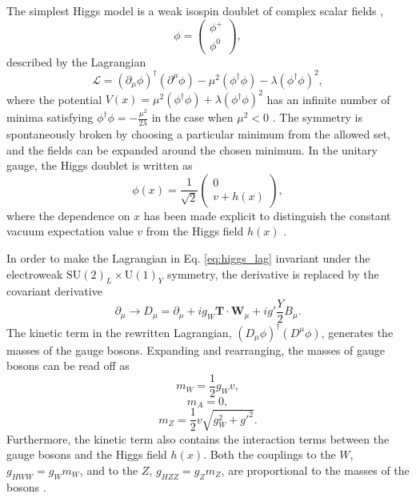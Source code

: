 The simplest Higgs model is a weak isospin doublet of complex scalar fields \cite{Thomson:2013zua},
\begin{equation}
\phi = \begin{pmatrix} \phi^+ \\ \phi^0 \end{pmatrix},
\end{equation}
described by the Lagrangian
\begin{equation}
\mathcal{L} = (\partial_\mu \phi)^\dag (\partial^\mu \phi) - \mu^2(\phi^\dag\phi) - \lambda(\phi^\dag \phi)^2,
\label{eq:higgs_lag}
\end{equation}
where the potential $V(x) = \mu^2(\phi^\dag\phi) + \lambda(\phi^\dag \phi)^2$
has an infinite number of minima satisfying $\phi^\dag \phi = -\frac{\mu^2}{2\lambda}$
in the case when $\mu^2 < 0$ \cite{Thomson:2013zua}. The symmetry is spontaneously broken by choosing a
particular minimum from the allowed set, and the fields can be expanded around the chosen minimum.
In the unitary gauge, the Higgs doublet is written as
\begin{equation}
\phi(x) = \frac{1}{\sqrt{2}} \begin{pmatrix} 0 \\ v + h(x) \end{pmatrix},
\end{equation}
where the dependence on $x$ has been made explicit to distinguish the constant
vacuum expectation value $v$ from the Higgs field $h(x)$ \cite{Thomson:2013zua}.

In order to make the Lagrangian in Eq. \ref{eq:higgs_lag} invariant under the electroweak
$\text{SU}(2)_L \times \text{U}(1)_Y$ symmetry, the derivative is replaced by the covariant
derivative \cite{Thomson:2013zua}
\begin{equation}
\partial_\mu \rightarrow D_\mu = \partial_\mu + i g_W \mathbf{T} \cdot \mathbf{W}_\mu
+ i g' \frac{Y}{2} B_\mu.
\end{equation}
The kinetic term in the rewritten Lagrangian, $(D_\mu \phi)^\dag (D^\mu \phi)$, generates the
masses of the gauge bosons. Expanding and rearranging, the masses of gauge bosons can be read off as
\begin{equation}
m_W = \frac{1}{2} g_W v,
\end{equation}
\begin{equation}
m_A = 0,
\end{equation}
\begin{equation}
m_Z = \frac{1}{2}v\sqrt{g_W^2 + g'^2}.
\end{equation}
Furthermore, the kinetic term also contains the interaction terms between the gauge bosons
and the Higgs field $h(x)$. Both the couplings to the $W$, $g_{HWW}=g_W m_W$, and to the $Z$,
$g_{HZZ} = g_Z m_Z$, are proportional to the masses of the bosons \cite{Thomson:2013zua}.

